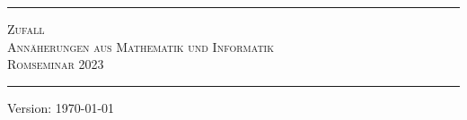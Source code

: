 \begin{titlepage}
	\newcommand{\HRule}{\rule{\linewidth}{.25mm}}
	\HRule
	\vspace*{10pt}
	\begin{center}
	  {\scshape {\Huge Zufall} \\
	  {\Large Annäherungen aus Mathematik und Informatik} \\[5mm]
				{\large Romseminar 2023} \\ }
	\vspace*{15pt}
	\vspace*{10pt}	  
	\end{center}
	\HRule
	\begin{center}
	  {Version: \today }
	\end{center}
\end{titlepage}
